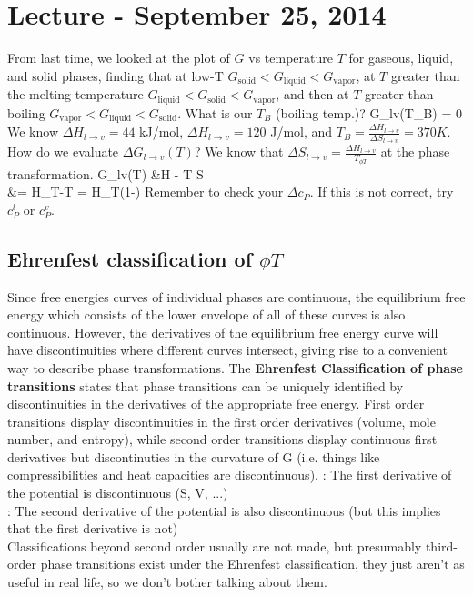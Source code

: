 \documentclass[12pt]{article}
\begin{document}
\section{Lecture - September 25, 2014}
From last time, we looked at the plot of $G$ vs temperature $T$ for gaseous, liquid, and solid phases, finding that at low-T $G_\text{solid} < G_\text{liquid} <  G_\text{vapor}$, at $T$ greater than the melting temperature $G_\text{liquid} < G_\text{solid} <  G_\text{vapor}$, and then at $T$ greater than boiling $G_\text{vapor} < G_\text{liquid} <  G_\text{solid}$.  What is our $T_B$ (boiling temp.)?
\eqs
\Delta G_{l\rightarrow v}(T_B) = 0
\eqe
We know $\Delta H_{l\rightarrow v} = 44$ kJ/mol, $\Delta H_{l\rightarrow v} = 120$ J/mol, and $T_B = \frac{\Delta H_{l\rightarrow v}}{\Delta S_{l\rightarrow v}} = 370 K$.  How do we evaluate $\Delta G_{l\rightarrow v}(T)$?  We know that $\Delta S_{l\rightarrow v} = \frac{\Delta H_{l\rightarrow v}}{T_{\phi T}}$ at the phase transformation.
\eqs
\Delta G_{l\rightarrow v}(T) &\approx \Delta H - T \Delta S\\
&= \Delta H_{\phi T}-T = \Delta H_{\phi T}(1-)
\eqe
Remember to check your $\Delta c_P$.  If this is not correct, try $c_P^{l}$ or $c_P^{v}$.\\

\subsection{Ehrenfest classification of $\phi T$}
Since free energies curves of individual phases are continuous, the equilibrium free energy which consists of the lower envelope of all of these curves is also continuous. However, the derivatives of the equilibrium free energy curve will have discontinuities where different curves intersect, giving rise to a convenient way to describe phase transformations. The \textbf{Ehrenfest Classification of phase transitions} states that phase transitions can be uniquely identified by discontinuities in the derivatives of the appropriate free energy. First order transitions display discontinuities in the first order derivatives (volume, mole number, and entropy), while second order transitions display continuous first derivatives but discontinuties in the curvature of G (i.e. things like compressibilities and heat capacities are discontinuous).
:  The first derivative of the potential is discontinuous (S, V, ...)\\
:  The second derivative of the potential is also discontinuous (but this implies that the first derivative is not)\\
Classifications beyond second order usually are not made, but presumably third-order phase transitions exist under the Ehrenfest classification, they just aren't as useful in real life, so we don't bother talking about them.
\end{document}
